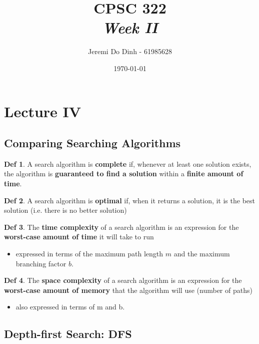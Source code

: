 \documentclass{article}
\theoremstyle{definition}
\newtheorem{definition}{Def}
\theoremstyle{example}
\begin{document}
\author{Jeremi Do Dinh - 61985628}
\title{{\bf CPSC 322}\\ {\it Week II}}
\date{\today}
\maketitle{}


\section*{Lecture IV}


\subsection*{Comparing Searching Algorithms}

\theoremstyle{definition}
\begin{definition}
	A search algorithm is {\bf complete} if, whenever at least one solution exists, the algorithm is {\bf guaranteed to find a solution} within a {\bf finite amount of time}.
\end{definition}
\begin{definition}
	A search algorithm is {\bf optimal} if, when it returns a solution, it is the best solution (i.e. there is no better solution)
\end{definition}

\begin{definition}
	The {\bf time complexity} of a search algorithm is an expression for the {\bf worst-case amount of time} it will take to run
	\begin{itemize}
		\item expressed in terms of the maximum path length $ m $ and the maximum branching factor $ b $.
	\end{itemize}
\end{definition}


\begin{definition}
	The {\bf space complexity} of a search algorithm is an expression for the {\bf worst-case amount of memory} that the algorithm will use (number of paths)
	\begin{itemize}
		\item also expressed in terms of m and b.
	\end{itemize}
\end{definition}

\subsection*{Depth-first Search: DFS}
\end{document}
